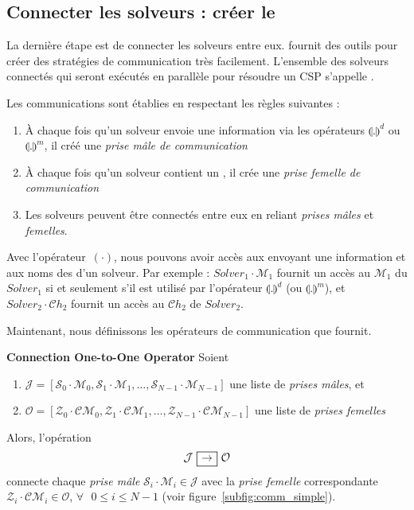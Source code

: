 \subsection{Connecter les solveurs : créer le \soset}

La dernière étape est de connecter les solveurs entre eux. \posl{} fournit des outils pour créer des stratégies de communication très facilement. L'ensemble des solveurs connectés qui seront exécutés en parallèle pour résoudre un CSP s'appelle \INTROsoset{}.

Les communications sont établies en respectant les règles suivantes :
\begin{enumerate}
\item  À chaque  fois qu'un  solveur  envoie une information via les opérateurs  $\llparenthesis .\rrparenthesis^{d}$  ou $\llparenthesis   .\rrparenthesis^{m}$, il créé une {\it prise mâle de communication} 
\item À chaque fois qu'un  solveur contient un \opch{}, il  crée une {\it prise femelle de communication} 
\item Les solveurs peuvent être connectés entre eux en reliant {\it prises mâles} et {\it femelles}.
\end{enumerate}

Avec l'opérateur~$(\cdot)$, nous  pouvons avoir accès aux  \oms{} envoyant une information et aux noms des \opchs{} d'un solveur. Par exemple : $Solver_1\cdot\mathcal{M}_1$ fournit un accès au \om{} $\mathcal{M}_1$ du $Solver_1$ si et seulement s'il est utilisé par l'opérateur  $\llparenthesis .\rrparenthesis^{d}$  (ou $\llparenthesis.\rrparenthesis^{m}$), et $Solver_2\cdot\mathcal{C}h_2$ fournit un accès au \opch{} $\mathcal{C}h_2$ de $Solver_2$.

Maintenant, nous définissons les opérateurs de communication que \posl{} fournit.

\begin{lemma}\label{op_conn:1to1}
{\bf Connection One-to-One Operator} Soient
\begin{enumerate}
\item $\mathcal{J} = \left[\mathcal{S}_0\cdot \mathcal{M}_0, \mathcal{S}_1\cdot \mathcal{M}_1,\dots, \mathcal{S}_{N-1}\cdot \mathcal{M}_{N-1}\right]$ une liste de  {\it prises mâles}, et
\item $\mathcal{O} = \left[\mathcal{Z}_0\cdot \mathcal{CM}_0, \mathcal{Z}_1\cdot \mathcal{CM}_1,\dots, \mathcal{Z}_{N-1}\cdot \mathcal{CM}_{N-1}\right]$ une liste de {\it prises femelles}
\end{enumerate} Alors, l'opération
\[
\mathcal{J} \onetoonesep \mathcal{O}
\]
connecte chaque {\it prise mâle} $\mathcal{S}_i\cdot \mathcal{M}_i \in \mathcal{J}$ avec la {\it prise femelle} correspondante $\mathcal{Z}_i\cdot \mathcal{CM}_i \in \mathcal{O}$, $\forall\textbf{ }0 \leq i \leq N-1$ (voir figure~\ref{subfig:comm_simple}).
\end{lemma}

